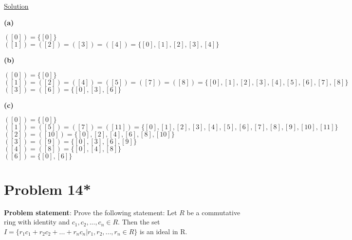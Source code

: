 \documentclass{article} %
\begin{document}
\underline{Solution}
\begin{addmargin}[1em]{0em}
\textbf{(a)}
\begin{addmargin}[1em]{0em}
$([0]) = \{[0]\}$
\\$([1]) = ([2]) = ([3]) = ([4]) = \{[0], [1], [2], [3], [4]\}$
\end{addmargin}

\textbf{(b)}
\begin{addmargin}[1em]{0em}
$([0]) = \{[0]\}$
\\$([1]) = ([2]) = ([4]) = ([5]) = ([7]) = ([8]) = \{[0], [1], [2], [3], [4], [5], [6], [7], [8]\}$
\\$([3]) = ([6]) = \{[0], [3], [6]\}$
\end{addmargin}

\textbf{(c)}
\begin{addmargin}[1em]{0em}
$([0]) = \{[0]\}$
\\$([1]) = ([5]) = ([7]) = ([11]) = \{[0],[1],[2],[3],[4],[5],[6],[7],[8],[9],[10],[11]\}$
\\$([2]) = ([10]) = \{[0], [2], [4], [6], [8], [10]\}$
\\$([3]) = ([9]) = \{[0], [3], [6], [9]\}$
\\$([4]) = ([8]) = \{[0], [4], [8]\}$
\\$([6]) = \{[0], [6]\}$
\end{addmargin}
\end{addmargin}

\newpage

\section*{Problem 14*}


\textbf{Problem statement}: Prove the following statement: Let $R$ be a commutative ring with identity and $c_1, c_2, ..., c_n \in R$.  Then the set $I = \{r_1c_1+r_2c_2 + ... + r_nc_n|r_1,r_2,...,r_n\in R\}$ is an ideal in R.
\\
\end{document}
